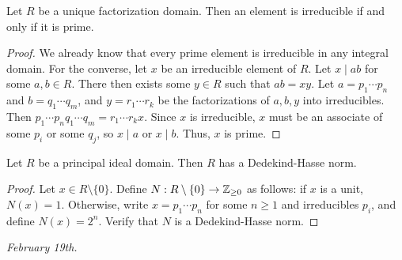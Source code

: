 \begin{proposition}
    Let $R$ be a unique factorization domain. Then an element is irreducible if and only if it is prime.
\end{proposition}
\begin{proof}
    We already know that every prime element is irreducible in any integral domain. For the converse, let $x$ be an irreducible element of $R$. Let $x \mid ab$ for some $a,b \in R$. There then exists some $y \in R$ such that $ab = xy$. Let $a = p_{1}\cdots p_{n}$ and $b = q_{1} \cdots q_{m}$, and $y = r_{1} \cdots r_{k}$ be the factorizations of $a,b,y$ into irreducibles. Then $p_{1} \cdots p_{n} q_{1} \cdots q_{m} = r_{1} \cdots r_{k} x$. Since $x$ is irreducible, $x$ must be an associate of some $p_{i}$ or some $q_{j}$, so $x \mid a$ or $x \mid b$. Thus, $x$ is prime.
\end{proof}

\begin{theorem}
    Let $R$ be a principal ideal domain. Then $R$ has a Dedekind-Hasse norm.
\end{theorem}

\begin{proof}
    Let $x \in R\setminus\{0\}$. Define $N : R\setminus\{0\} \to \mathbb{Z}_{\geq 0}$ as follows: if $x$ is a unit, $N(x) = 1$. Otherwise, write $x = p_{1} \cdots p_{n}$ for some $n \geq 1$ and irreducibles $p_{i}$, and define $N(x) = 2^{n}$. Verify that $N$ is a Dedekind-Hasse norm. 
\end{proof}


\textit{February 19th.}

